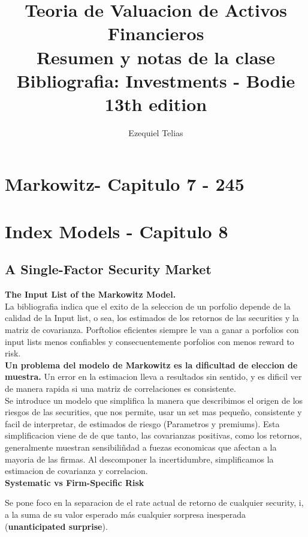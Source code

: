\documentclass{article}
\title{
    \textbf{Teoria de Valuacion de Activos Financieros} \\ 
    Resumen y notas de la clase
    \\
    \small Bibliografia: Investments - Bodie 13th edition
}
\author{Ezequiel Telias}
\date{}
\begin{document}
\maketitle

\section{Markowitz- Capitulo 7 - 245}

\section{Index Models - Capitulo 8}
\subsection{A Single-Factor Security Market}
\textbf{The Input List of the Markowitz Model.}\\

La bibliografia indica que el exito de la seleccion de un porfolio depende de la calidad de la Input list, 
o sea, los estimados de los retornos de las securities y la matriz de covarianza. 
Porftolios eficientes siempre le van a ganar a porfolios con input lists menos confiables y consecuentemente 
porfolios con menos reward to risk.
\\

\textbf{Un problema del modelo de Markowitz es la dificultad de eleccion de muestra.}
Un error en la estimacion lleva a resultados sin sentido, y es dificil ver de manera rapida si una matriz de correlaciones es consistente.
\\

Se introduce un modelo que simplifica la manera que describimos el origen de los riesgos de las securities, que nos permite, 
usar un set mas pequeño, consistente y facil de interpretar, de estimados de riesgo (Parametros y premiums). Esta simplificacion viene 
de de que tanto, las covarianzas positivas, como los retornos, generalmente muestran sensibiliñdad a fuezas economicas que afectan a la
mayoria de las firmas. Al descomponer la incertidumbre,  simplificamos la estimacion de covarianza y correlacion.
\\

\textbf{Systematic vs Firm-Specific Risk}

Se pone foco en la separacion de el rate actual de retorno de cualquier security, i, a la suma de su valor esperado 
más cualquier sorpresa inesperada (\textbf{unanticipated surprise}).
\end{document}
